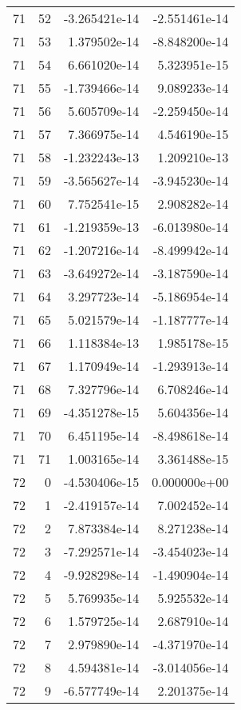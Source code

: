 \begin{tabular}{rrrr}
  71 &   52 & -3.265421e-14 & -2.551461e-14 \\
  71 &   53 &  1.379502e-14 & -8.848200e-14 \\
  71 &   54 &  6.661020e-14 &  5.323951e-15 \\
  71 &   55 & -1.739466e-14 &  9.089233e-14 \\
  71 &   56 &  5.605709e-14 & -2.259450e-14 \\
  71 &   57 &  7.366975e-14 &  4.546190e-15 \\
  71 &   58 & -1.232243e-13 &  1.209210e-13 \\
  71 &   59 & -3.565627e-14 & -3.945230e-14 \\
  71 &   60 &  7.752541e-15 &  2.908282e-14 \\
  71 &   61 & -1.219359e-13 & -6.013980e-14 \\
  71 &   62 & -1.207216e-14 & -8.499942e-14 \\
  71 &   63 & -3.649272e-14 & -3.187590e-14 \\
  71 &   64 &  3.297723e-14 & -5.186954e-14 \\
  71 &   65 &  5.021579e-14 & -1.187777e-14 \\
  71 &   66 &  1.118384e-13 &  1.985178e-15 \\
  71 &   67 &  1.170949e-14 & -1.293913e-14 \\
  71 &   68 &  7.327796e-14 &  6.708246e-14 \\
  71 &   69 & -4.351278e-15 &  5.604356e-14 \\
  71 &   70 &  6.451195e-14 & -8.498618e-14 \\
  71 &   71 &  1.003165e-14 &  3.361488e-15 \\
  72 &    0 & -4.530406e-15 &  0.000000e+00 \\
  72 &    1 & -2.419157e-14 &  7.002452e-14 \\
  72 &    2 &  7.873384e-14 &  8.271238e-14 \\
  72 &    3 & -7.292571e-14 & -3.454023e-14 \\
  72 &    4 & -9.928298e-14 & -1.490904e-14 \\
  72 &    5 &  5.769935e-14 &  5.925532e-14 \\
  72 &    6 &  1.579725e-14 &  2.687910e-14 \\
  72 &    7 &  2.979890e-14 & -4.371970e-14 \\
  72 &    8 &  4.594381e-14 & -3.014056e-14 \\
  72 &    9 & -6.577749e-14 &  2.201375e-14 \\

\end{tabular}
